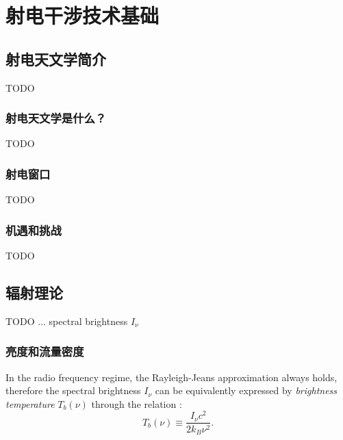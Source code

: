 
\chapter{射电干涉技术基础}
\label{chap:interferometry}

\section{射电天文学简介}
\label{sec:radio-astronomy}

TODO

\subsection{射电天文学是什么？}

TODO

\subsection{射电窗口}

TODO

\subsection{机遇和挑战}

TODO


\section{辐射理论}
\label{sec:radiation}

TODO ...
spectral brightness $I_{\nu}$

\subsection{亮度和流量密度}

In the radio frequency regime, the Rayleigh-Jeans approximation
always holds, therefore the spectral brightness $I_{\nu}$ can be
equivalently expressed by \emph{brightness temperature} $T_b(\nu)$
through the relation \cite{condon2016}:
\begin{equation}
  \label{eq:Tb}
  T_b(\nu) \equiv \frac{I_{\nu} c^2}{2 k_B \nu^2}.
\end{equation}

